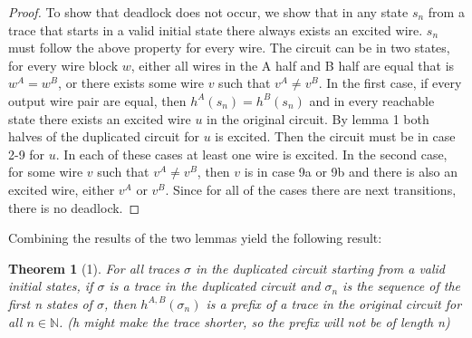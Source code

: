 \documentclass{article}
\newtheorem*{theorem}{Theorem}
\begin{document}
\begin{proof}
To show that deadlock does not occur, we show that in any state $s_n$ from a trace that starts in a valid initial state there always exists an excited wire.  $s_n$ must follow the above property for every wire.   The circuit can be in two states, for every wire block $w$, either all wires in the A half and B half are equal that is $w^A=w^B$, or there exists some wire $v$ such that $v^A\neq v^B$.  In the first case, if every output wire pair are equal, then $h^A(s_n)=h^B(s_n)$ and in every reachable state there exists an excited wire $u$ in the original circuit.  By lemma 1 both halves of the duplicated circuit for $u$ is excited.  Then the circuit must be in case 2-9 for $u$.  In each of these cases at least one wire is excited.  \newline
In the second case, for some wire $v$ such that $v^A\neq v^B$, then $v$ is in case 9a or 9b and there is also an excited wire, either $v^A$ or $v^B$.  Since for all of the cases there are next transitions, there is no deadlock.
\end{proof}


Combining the results of the two lemmas yield the following result:
\begin{theorem}[1]
For all traces $\sigma$ in the duplicated circuit starting from a valid initial states, if $\sigma$ is a trace in the duplicated circuit and $\sigma_n$ is the sequence of the first n states of $\sigma$, then $h^{A,B}(\sigma_n)$ is a prefix of a trace in the original circuit for all $n \in \mathbb{N}$.  (h might make the trace shorter, so the prefix will not be of length n)
\end{theorem}

\end{document}
